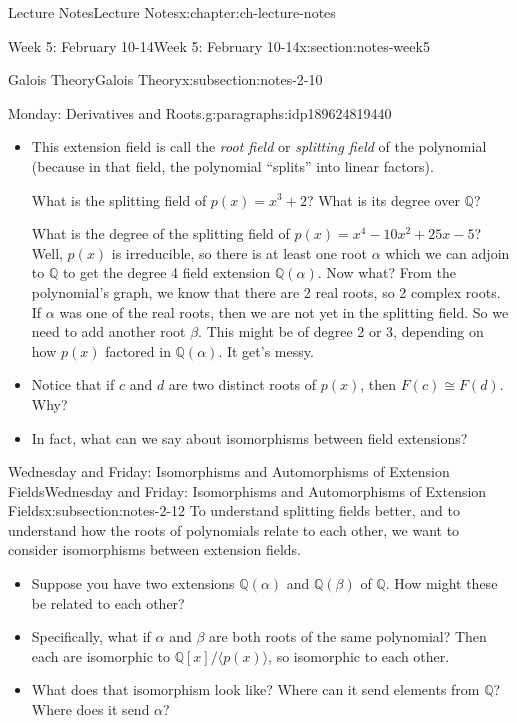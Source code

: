 \documentclass[oneside,11pt,]{book}
\begin{document}
\begin{chapterptx}{Lecture Notes}{}{Lecture Notes}{}{}{x:chapter:ch-lecture-notes}
\begin{sectionptx}{Week 5: February 10-14}{}{Week 5: February 10-14}{}{}{x:section:notes-week5}
\begin{subsectionptx}{Galois Theory}{}{Galois Theory}{}{}{x:subsection:notes-2-10}
\begin{paragraphs}{Monday: Derivatives and Roots.}{g:paragraphs:idp189624819440}
\begin{itemize}[label=\textbullet]
\item{}This extension field is call the \emph{root field} or \emph{splitting field} of the polynomial (because in that field, the polynomial ``splits'' into linear factors).%
\par
What is the splitting field of \(p(x) = x^3 + 2\)? What is its degree over \(\mathbb Q\)?%
\par
What is the degree of the splitting field of \(p(x) = x^4 - 10x^2 + 25x - 5\)? Well, \(p(x)\) is irreducible, so there is at least one root \(\alpha\) which we can adjoin to \(\mathbb Q\) to get the degree 4 field extension \(\mathbb Q(\alpha)\). Now what? From the polynomial’s graph, we know that there are 2 real roots, so 2 complex roots. If \(\alpha\) was one of the real roots, then we are not yet in the splitting field. So we need to add another root \(\beta\). This might be of degree 2 or 3, depending on how \(p(x)\) factored in \(\mathbb Q(\alpha)\). It get’s messy.%
\item{}Notice that if \(c\) and \(d\) are two distinct roots of \(p(x)\), then \(F(c) \cong F(d)\). Why?%
\item{}In fact, what can we say about isomorphisms between field extensions?%
\end{itemize}
%
\end{paragraphs}%
\end{subsectionptx}
%
%
\typeout{************************************************}
\typeout{************************************************}
%
\begin{subsectionptx}{Wednesday and Friday: Isomorphisms and Automorphisms of Extension Fields}{}{Wednesday and Friday: Isomorphisms and Automorphisms of Extension Fields}{}{}{x:subsection:notes-2-12}
To understand splitting fields better, and to understand how the roots of polynomials relate to each other, we want to consider isomorphisms between extension fields.%
\par
%
\begin{itemize}[label=\textbullet]
\item{}Suppose you have two extensions \(\mathbb Q(\alpha)\) and \(\mathbb Q(\beta)\) of \(\mathbb Q\). How might these be related to each other?%
\item{}Specifically, what if \(\alpha\) and \(\beta\) are both roots of the same polynomial? Then each are isomorphic to \(\mathbb Q[x]/\langle p(x)\rangle\), so isomorphic to each other.%
\item{}What does that isomorphism look like? Where can it send elements from \(\mathbb Q\)? Where does it send \(\alpha\)?%

\end{itemize}
\end{subsectionptx}
\end{sectionptx}
\end{chapterptx}
\end{document}
